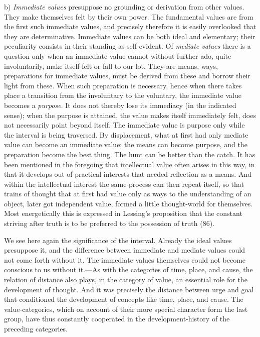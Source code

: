 \documentclass[12pt,a4paper]{book}
\newcommand{\opage}[1]{\marginnote{\footnotesize\textit{[#1]}}}
\begin{document}
b) \emph{Immediate values} presuppose no grounding or derivation from other
values. They make themselves felt by their own power. The fundamental values
are from the first such immediate values, and precisely therefore it is
easily overlooked that they are determinative. Immediate values can be both
ideal and elementary; their peculiarity consists in their standing as
self-evident. Of \emph{mediate values} there is a question only when an
immediate value cannot without further ado, quite involuntarily, make itself
felt or fall to our lot. They are means, ways, preparations for immediate
values, must be derived from these and borrow their light \opage{242}from these. When
such preparation is necessary, hence when there takes place a transition from
the involuntary to the voluntary, the immediate value becomes a
\emph{purpose}. It does not thereby lose its immediacy (in the indicated
sense); when the purpose is attained, the value makes itself immediately felt,
does not necessarily point beyond itself. The immediate value is purpose only
while the interval is being traversed. By displacement, what at first had only
mediate value can become an immediate value; the means can become purpose, and
the preparation become the best thing. The hunt can be better than the catch.
It has been mentioned in the foregoing that intellectual value often arises in
this way, in that it develops out of practical interests that needed
reflection as a means. And within the intellectual interest the same process
can then repeat itself, so that trains of thought that at first had value only
as ways to the understanding of an object, later got independent value, formed
a little thought-world for themselves. Most energetically this is expressed in
Lessing's proposition that the constant striving after truth is to be
preferred to the possession of truth (86).

We see here again the significance of the interval. Already the ideal values
presuppose it, and the difference between immediate and mediate values could
not come forth without it. The immediate values themselves could not become
conscious to us without it.---As with the categories of time, place, and
cause, the relation of distance also plays, in the category of value, an
essential role for the development of thought. And it was precisely the
distance between urge and goal that conditioned the development of concepts
like time, place, and cause. The value-categories, which on account of their
more special character form the last group, have thus constantly cooperated in
the development-history of the preceding categories.
\end{document}
